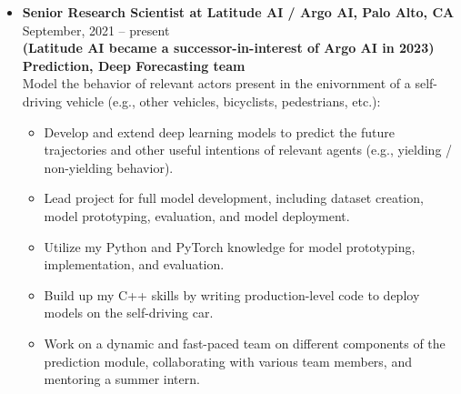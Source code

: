 \documentclass[10pt,letterpaper]{article}
\newcommand{\thing}[2]{{#1} \hfill {#2}}
\begin{document}
%	
%

\begin{itemize}%

\item \thing{\bf Senior Research Scientist at Latitude AI / Argo AI, Palo Alto, CA}{September, 2021 -- present}\\
	{\bf (Latitude AI became a successor-in-interest of Argo AI in 2023)} \\
	{\bf Prediction, Deep Forecasting team}\vspace{0.5em}\\
      	Model the behavior of relevant actors present in the enivornment of a self-driving vehicle (e.g., other vehicles, bicyclists, pedestrians, etc.):
      	\begin{itemize} \itemsep0em 
      	\vspace{-0.5em}
      		\item Develop and extend deep learning models to predict the future trajectories and other useful intentions of relevant agents (e.g., yielding / non-yielding behavior).
      		\item Lead project for full model development, including dataset creation, model prototyping, evaluation, and model deployment.
      		\item Utilize my Python and PyTorch knowledge for model prototyping, implementation, and evaluation.
      		\item Build up my C++ skills by writing production-level code to deploy models on the self-driving car.
      		\item Work on a dynamic and fast-paced team on different components of the prediction module, collaborating with various team members, and mentoring a summer intern.
	\end{itemize}
	

\end{itemize}
\end{document}
